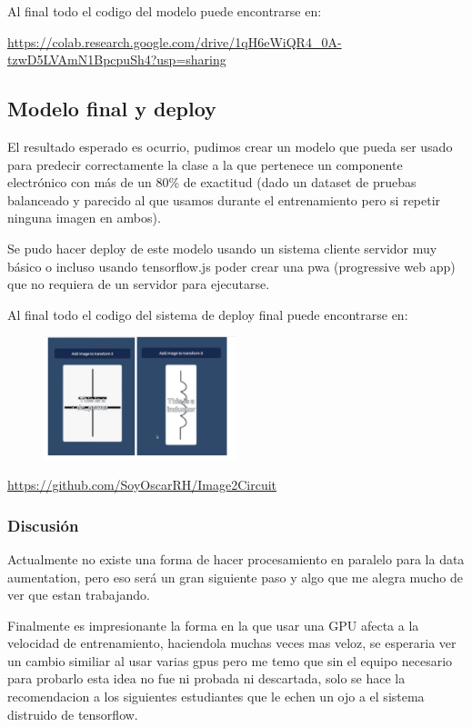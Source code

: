 \documentclass[10pt, fleqn, journal]{IEEEtran}
\theoremstyle{break}                                            %
\begin{document}
    Al final todo el codigo del modelo puede encontrarse en:

    \url{https://colab.research.google.com/drive/1qH6eWiQR4_0A-tzwD5LVAmN1BpcpuSh4?usp=sharing}


    \subsection{Modelo final y deploy}

    El resultado esperado es ocurrio, pudimos crear un modelo que pueda ser usado para
    predecir correctamente la clase a la que pertenece un componente electrónico 
    con más de un 80\% de exactitud (dado un dataset de pruebas balanceado y parecido 
    al que usamos durante el entrenamiento pero si repetir ninguna imagen en ambos).

    Se pudo hacer deploy de este modelo usando un 
    sistema cliente servidor muy básico o incluso usando tensorflow.js poder crear
    una pwa (progressive web app) que no requiera de un servidor para ejecutarse.

    Al final todo el codigo del sistema de deploy final puede encontrarse en:

    \begin{figure}[ht!]
      \includegraphics[width=0.5\textwidth]{final}
    \end{figure}

    \url{https://github.com/SoyOscarRH/Image2Circuit}

    \subsubsection{Discusión}

    Actualmente no existe una forma de hacer procesamiento en paralelo para la data aumentation, 
    pero eso será un gran siguiente paso y algo que me alegra mucho de ver que estan trabajando.

    Finalmente es impresionante la forma en la que usar una GPU afecta a la velocidad de 
    entrenamiento, haciendola muchas veces mas veloz, se esperaria ver un cambio similiar al usar
    varias gpus pero me temo que sin el equipo necesario para probarlo esta idea no fue ni probada ni
    descartada, solo se hace la recomendacion a los siguientes estudiantes que le echen un ojo
    a el sistema distruido de tensorflow.
\end{document}
